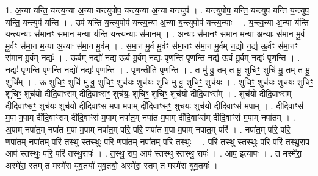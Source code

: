 \documentclass[17pt]{extarticle}
\begin{document}
1. अ॒न्या यन्ति॒ यन्त्य॒न्या अ॒न्या यन्त्युपोप॒ यन्त्य॒न्या अ॒न्या यन्त्युप॑ । . यन्त्युपोप॒ यन्ति॒ यन्त्युप॑ यन्ति य॒न्त्युप॒ यन्ति॒ यन्त्युप॑ यन्ति । . उप॑ यन्ति य॒न्त्युपोप॑ यन्त्य॒न्या अ॒न्या य॒न्त्युपोप॑ यन्त्य॒न्याः । . य॒न्त्य॒न्या अ॒न्या य॑न्ति यन्त्य॒न्याः स॑मा॒नꣳ स॑मा॒न म॒न्या य॑न्ति यन्त्य॒न्याः स॑मा॒नम् । . अ॒न्याः स॑मा॒नꣳ स॑मा॒न म॒न्या अ॒न्याः स॑मा॒न मू॒र्व मू॒र्वꣳ स॑मा॒न म॒न्या अ॒न्याः स॑मा॒न मू॒र्वम् । . स॒मा॒न मू॒र्व मू॒र्वꣳ स॑मा॒नꣳ स॑मा॒न मू॒र्वम् न॒द्यो॑ न॒द्य॑ ऊ॒र्वꣳ स॑मा॒नꣳ स॑मा॒न मू॒र्वम् न॒द्यः॑ । . ऊ॒र्वम् न॒द्यो॑ न॒द्य॑ ऊ॒र्व मू॒र्वम् न॒द्यः॑ पृणन्ति पृणन्ति न॒द्य॑ ऊ॒र्व मू॒र्वम् न॒द्यः॑ पृणन्ति । . न॒द्यः॑ पृणन्ति पृणन्ति न॒द्यो॑ न॒द्यः॑ पृणन्ति । . पृ॒ण॒न्तीति॑ पृणन्ति । . त मु॑ वु॒ तम् त मू॒ शुचिꣳ॒॒ शुचि॑ मु॒ तम् त मू॒ शुचि᳚म् । . ऊ॒ शुचिꣳ॒॒ शुचि॑ मु वू॒ शुचिꣳ॒॒ शुच॑यः॒ शुच॑यः॒ शुचि॑ मु वू॒ शुचिꣳ॒॒ शुच॑यः । . शुचिꣳ॒॒ शुच॑यः॒ शुच॑यः॒ शुचिꣳ॒॒ शुचिꣳ॒॒ शुच॑यो दीदि॒वाꣳस॑म् दीदि॒वाꣳसꣳ॒॒ शुच॑यः॒ शुचिꣳ॒॒ शुचिꣳ॒॒ शुच॑यो दीदि॒वाꣳस᳚म् । . शुच॑यो दीदि॒वाꣳस॑म् दीदि॒वाꣳसꣳ॒॒ शुच॑यः॒ शुच॑यो दीदि॒वाꣳस॑ म॒पा म॒पाम् दी॑दि॒वाꣳसꣳ॒॒ शुच॑यः॒ शुच॑यो दीदि॒वाꣳस॑ म॒पाम् । . दी॒दि॒वाꣳस॑ म॒पा म॒पाम् दी॑दि॒वाꣳस॑म् दीदि॒वाꣳस॑ म॒पाम् नपा॑त॒म् नपा॑त म॒पाम् दी॑दि॒वाꣳस॑म् दीदि॒वाꣳस॑ म॒पाम् नपा॑तम् । . अ॒पाम् नपा॑त॒म् नपा॑त म॒पा म॒पाम् नपा॑त॒म् परि॒ परि॒ णपा॑त म॒पा म॒पाम् नपा॑त॒म् परि॑ । . नपा॑त॒म् परि॒ परि॒ णपा॑त॒म् नपा॑त॒म् परि॑ तस्थु स्तस्थुः॒ परि॒ णपा॑त॒म् नपा॑त॒म् परि॑ तस्थुः । . परि॑ तस्थु स्तस्थुः॒ परि॒ परि॑ तस्थु॒राप॒ आप॑ स्तस्थुः॒ परि॒ परि॑ तस्थु॒रापः॑ । . त॒स्थु॒ राप॒ आप॑ स्तस्थु स्तस्थु॒ रापः॑ । . आप॒ इत्यापः॑ । . त मस्मे॑रा॒ अस्मे॑रा॒ स्तम् त मस्मे॑रा युव॒तयो॑ युव॒तयो॒ अस्मे॑रा॒ स्तम् त मस्मे॑रा युव॒तयः॑ । \newline
\end{document}
